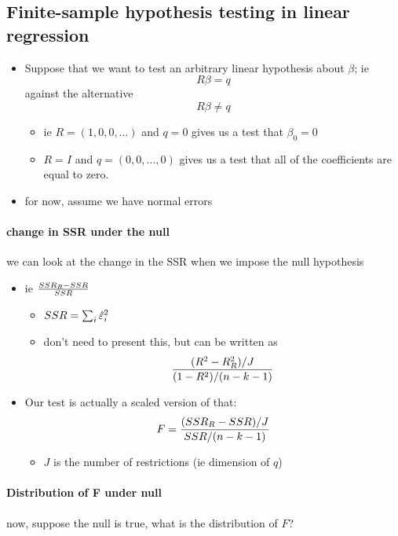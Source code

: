 \subsection{Finite-sample hypothesis testing in linear regression}

\begin{itemize}[leftmargin=0pt]

\item Suppose that we want to test an arbitrary linear hypothesis about
  $\beta$; ie \[R \beta = q\] against the alternative \[R \beta \neq q\]
\begin{itemize}
\item ie $R = (1, 0, 0, ...)$ and $q=0$ gives us a test that $\beta_0=0$
\item $R = I$ and $q = (0,0,...,0)$ gives us a test that all of the
         coefficients are equal to zero.
\end{itemize}
\item for now, assume we have normal errors
\end{itemize}

\paragraph{change in SSR under the null}
      we can look at the change in the SSR when we impose the null
        hypothesis
\begin{itemize}
\item ie ${SSR_R - SSR \over SSR}$
\begin{itemize}
\item $SSR = \sum_i \hat{\varepsilon}^2_i$
\item don't need to present this, but can be written as \[
  {(R^2 - R^2_R) / J \over (1-R^2) / (n-k-1)} \]
\end{itemize}
\item Our test is actually a scaled version of that:
  \[ F = {(SSR_R - SSR)/J \over SSR / (n-k-1)} \]
\begin{itemize}
\item $J$ is the number of restrictions (ie dimension of $q$)
\end{itemize}
\end{itemize}

\paragraph{Distribution of F under null}
      now, suppose the null is true, what is the distribution of $F$?

